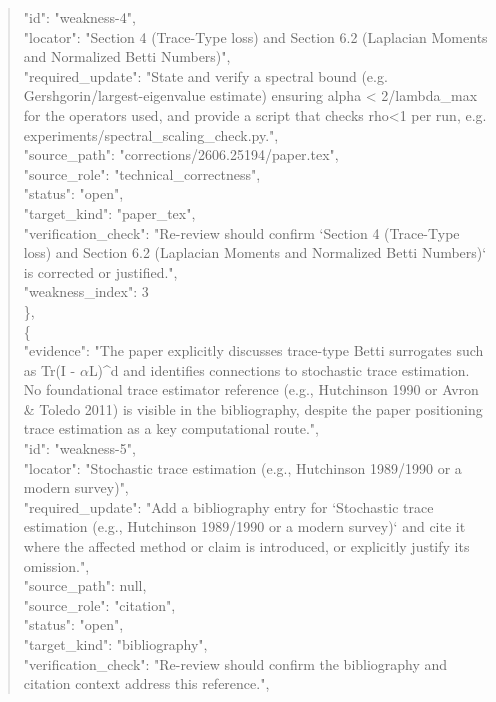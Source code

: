 \documentclass[11pt]{article}
\begin{document}
\begin{quote}
      "id": "weakness-4",\\
      "locator": "Section 4 (Trace-Type loss) and Section 6.2 (Laplacian Moments and Normalized Betti Numbers)",\\
      "required\_update": "State and verify a spectral bound (e.g. Gershgorin/largest-eigenvalue estimate) ensuring alpha < 2/lambda\_max for the operators used, and provide a script that checks rho<1 per run, e.g. experiments/spectral\_scaling\_check.py.",\\
      "source\_path": "corrections/2606.25194/paper.tex",\\
      "source\_role": "technical\_correctness",\\
      "status": "open",\\
      "target\_kind": "paper\_tex",\\
      "verification\_check": "Re-review should confirm `Section 4 (Trace-Type loss) and Section 6.2 (Laplacian Moments and Normalized Betti Numbers)` is corrected or justified.",\\
      "weakness\_index": 3\\
    \},\\
    \{\\
      "evidence": "The paper explicitly discusses trace-type Betti surrogates such as Tr(I - \ensuremath{\alpha}L)\^{}d and identifies connections to stochastic trace estimation. No foundational trace estimator reference (e.g., Hutchinson 1990 or Avron \& Toledo 2011) is visible in the bibliography, despite the paper positioning trace estimation as a key computational route.",\\
      "id": "weakness-5",\\
      "locator": "Stochastic trace estimation (e.g., Hutchinson 1989/1990 or a modern survey)",\\
      "required\_update": "Add a bibliography entry for `Stochastic trace estimation (e.g., Hutchinson 1989/1990 or a modern survey)` and cite it where the affected method or claim is introduced, or explicitly justify its omission.",\\
      "source\_path": null,\\
      "source\_role": "citation",\\
      "status": "open",\\
      "target\_kind": "bibliography",\\
      "verification\_check": "Re-review should confirm the bibliography and citation context address this reference.",\\

\end{quote}
\end{document}
